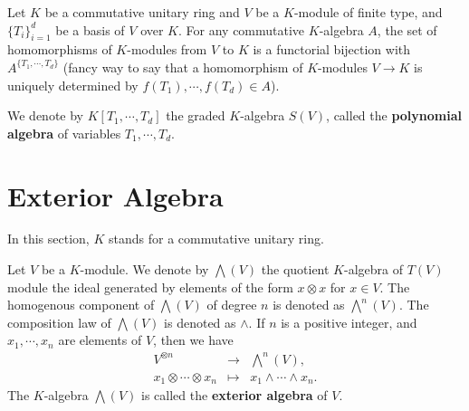 \begin{exampleenv}
    Let $K$ be a commutative unitary ring and $V$ be a $K$-module of finite type, and $\{T_i\}_{i=1}^{d}$ be a basis of $V$ over $K$.
    For any commutative $K$-algebra $A$, the set of homomorphisms of $K$-modules from $V$ to $K$ is a functorial bijection with $A^{\{T_1,\cdots,T_d\}}$ (fancy way to say that a homomorphism of $K$-modules $V \rightarrow K$ is uniquely determined by $f(T_1), \cdots, f(T_d) \in A$).
    
    \quad We denote by $K[T_1,\cdots, T_d]$ the graded $K$-algebra $S(V)$, called the \textbf{polynomial algebra} of variables $T_1, \cdots, T_d$. 
\end{exampleenv}
\newpage

\section{Exterior Algebra}
In this section, $K$ stands for a commutative unitary ring.

\begin{definitionenv}
    Let $V$ be a $K$-module.
    We denote by $\bigwedge (V)$ the quotient $K$-algebra of $T(V)$ module the ideal generated by elements of the form $x\otimes x$ for $x \in V$.
    The homogenous component of $\bigwedge (V)$ of degree $n$ is denoted as $\bigwedge^n (V)$.
    The composition law of $\bigwedge (V)$ is denoted as $\wedge$.
    If $n$ is a positive integer, and $x_1, \cdots, x_n$ are elements of $V$, then we have
    $$\begin{array}{rcl}
        V^{\otimes n} & \longrightarrow & \bigwedge^n (V),\\
        x_1 \otimes \cdots \otimes x_n & \longmapsto & x_1 \wedge \cdots \wedge x_n.
    \end{array}$$
    The $K$-algebra $\bigwedge (V)$ is called the \textbf{exterior algebra} of $V$.
\end{definitionenv}

